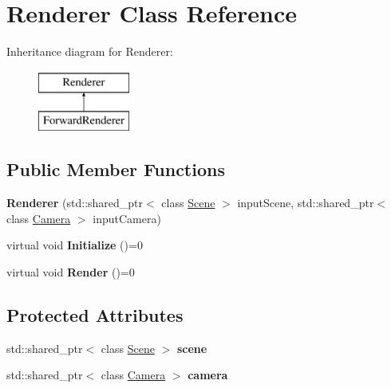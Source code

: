 \hypertarget{class_renderer}{}\section{Renderer Class Reference}
\label{class_renderer}
Inheritance diagram for Renderer\+:\begin{figure}[H]
\begin{center}
\leavevmode
\includegraphics[height=2.000000cm]{class_renderer}
\end{center}
\end{figure}
\subsection*{Public Member Functions}
\begin{DoxyCompactItemize}
\item 
\hypertarget{class_renderer_adc8ce31cd649bdf220ca8355809b1d06}{}{\bfseries Renderer} (std\+::shared\+\_\+ptr$<$ class \hyperlink{class_scene}{Scene} $>$ input\+Scene, std\+::shared\+\_\+ptr$<$ class \hyperlink{class_camera}{Camera} $>$ input\+Camera)\label{class_renderer_adc8ce31cd649bdf220ca8355809b1d06}

\item 
\hypertarget{class_renderer_a7cb221f355f181d84d66e8c09f50f04a}{}virtual void {\bfseries Initialize} ()=0\label{class_renderer_a7cb221f355f181d84d66e8c09f50f04a}

\item 
\hypertarget{class_renderer_a38623da22aa718cfa41e2514ebd269f5}{}virtual void {\bfseries Render} ()=0\label{class_renderer_a38623da22aa718cfa41e2514ebd269f5}

\end{DoxyCompactItemize}
\subsection*{Protected Attributes}
\begin{DoxyCompactItemize}
\item 
\hypertarget{class_renderer_a65178695d48824d3afd6fe40fd4915b6}{}std\+::shared\+\_\+ptr$<$ class \hyperlink{class_scene}{Scene} $>$ {\bfseries scene}\label{class_renderer_a65178695d48824d3afd6fe40fd4915b6}

\item 
\hypertarget{class_renderer_a7a08c6489c1ffe8e346b9f205b4014ca}{}std\+::shared\+\_\+ptr$<$ class \hyperlink{class_camera}{Camera} $>$ {\bfseries camera}\label{class_renderer_a7a08c6489c1ffe8e346b9f205b4014ca}

\end{DoxyCompactItemize}


